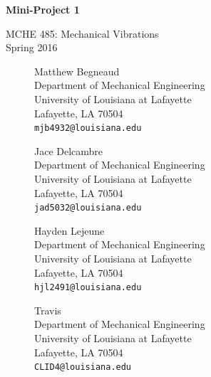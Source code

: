 \documentclass[11pt]{article}
\begin{document}
\thispagestyle{empty}
\begin{center}
\vspace*{1.5in}
{\LARGE \textbf{Mini-Project 1}} %

{\Large MCHE 485: Mechanical Vibrations\\ \vspace*{0.1in} Spring 2016}

\vspace*{2.5in}

\begin{figure}[!h]
\begin{minipage}{0.45\textwidth}
\begin{center}
Matthew Begneaud \\
Department of Mechanical Engineering\\
University of Louisiana at Lafayette\\
Lafayette, LA 70504\\
{\tt mjb4932@louisiana.edu}
\end{center}
\end{minipage}
\hspace{0.08\textwidth}
\begin{minipage}{0.45\textwidth}
\begin{center}
Jace Delcambre\\
Department of Mechanical Engineering\\
University of Louisiana at Lafayette\\
Lafayette, LA 70504\\
\tt{jad5032@louisiana.edu}
\end{center}
\end{minipage}
\end{figure}

\vspace{0.2in}
\begin{figure}[!h]
\begin{minipage}{0.45\textwidth}
\begin{center}
Hayden Lejeune \\
Department of Mechanical Engineering\\
University of Louisiana at Lafayette\\
Lafayette, LA 70504\\
{\tt hjl2491@louisiana.edu}
\end{center}
\end{minipage}
\hspace{0.08\textwidth}
\begin{minipage}{0.45\textwidth}
\begin{center}
Travis \\
Department of Mechanical Engineering\\
University of Louisiana at Lafayette\\
Lafayette, LA 70504\\
\tt{CLID4@louisiana.edu}
\end{center}
\end{minipage}
\end{figure}
\end{center}
\end{document}
